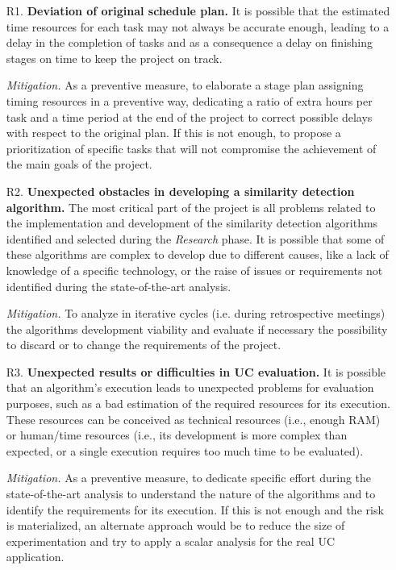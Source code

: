 \documentclass[11pt]{article}
\begin{document}
\begin{itemize}

\item[R1.] \textbf{Deviation of original schedule plan.} It is possible that the estimated time resources for each task may not always be accurate enough, leading to a delay in the completion of tasks and as a consequence a delay on finishing stages on time to keep the project on track.

\textit{Mitigation.} As a preventive measure, to elaborate a stage plan assigning timing resources in a preventive way, dedicating a ratio of extra hours per task and a time period at the end of the project to correct possible delays with respect to the original plan. If this is not enough, to propose a prioritization of specific tasks that will not compromise the achievement of the main goals of the project.

\item[R2.] \textbf{Unexpected obstacles in developing a similarity detection algorithm.} The most critical part of the project is all problems related to the implementation and development of the similarity detection algorithms identified and selected during the \textit{Research} phase. It is possible that some of these algorithms are complex to develop due to different causes, like a lack of knowledge of a specific technology, or the raise of issues or requirements not identified during the state-of-the-art analysis.

\textit{Mitigation.} To analyze in iterative cycles (i.e. during retrospective meetings) the algorithms development viability and evaluate if necessary the possibility to discard or to change the requirements of the project. 

\item[R3.] \textbf{Unexpected results or difficulties in UC evaluation.} It is possible that an algorithm's execution leads to unexpected problems for evaluation purposes, such as a bad estimation of the required resources for its execution. These resources can be conceived as technical resources (i.e., enough RAM) or human/time resources (i.e., its development is more complex than expected, or a single execution requires too much time to be evaluated).

\textit{Mitigation.} As a preventive measure, to dedicate specific effort during the state-of-the-art analysis to understand the nature of the algorithms and to identify the requirements for its execution. If this is not enough and the risk is materialized, an alternate approach would be to reduce the size of experimentation and try to apply a scalar analysis for the real UC application.
\end{itemize}
\end{document}
